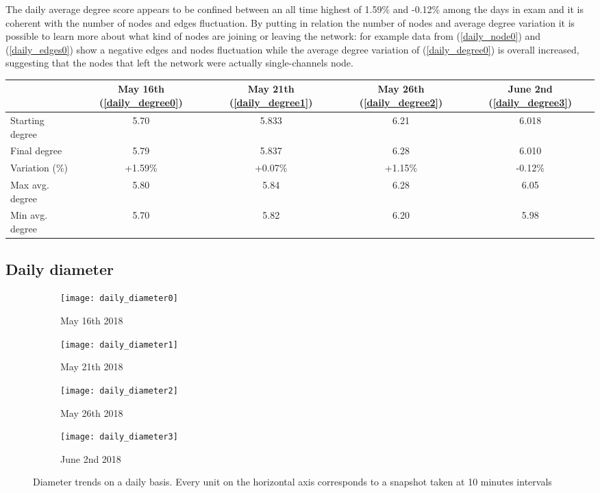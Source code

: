 	The daily average degree score appears to be confined between an all time highest of 1.59\% and -0.12\% among the days in exam and it is coherent with the number of nodes and edges fluctuation. By putting in relation the number of nodes and average degree variation it is possible to learn more about what kind of nodes are joining or leaving the network: for example data from (\ref{daily_node0}) and (\ref{daily_edges0}) show a negative edges and nodes fluctuation while the average degree variation of (\ref{daily_degree0}) is overall increased, suggesting that the nodes that left the network were actually single-channels node.


	\begin{center}
		\begin{tabulary}{\linewidth}{| L | C | C | C | C |}
			\hline	
			& May 16th (\ref{daily_degree0}) & May 21th (\ref{daily_degree1}) & May 26th (\ref{daily_degree2}) & June 2nd (\ref{daily_degree3}) \\
			\hline
			Starting degree & 5.70 & 5.833 & 6.21  & 6.018 \\ \hline
			Final degree & 5.79 & 5.837 & 6.28 & 6.010 \\ \hline
			Variation (\%) & +1.59\% & +0.07\% & +1.15\% & -0.12\% \\ \hline
			Max avg. degree & 5.80 & 5.84 & 6.28 & 6.05 \\ \hline
			Min avg. degree & 5.70 & 5.82 & 6.20 & 5.98 \\ \hline		
		\end{tabulary}
	\end{center}
	
	\subsection{Daily diameter}
	
		\begin{figure}[h]
		\centering
		\begin{subfigure}{0.49\textwidth}
			\centering
			\texttt{[image: daily\_diameter0]}
			\caption{May 16th 2018}
			\label{daily_diameter0}
		\end{subfigure}
		\begin{subfigure}{0.49\textwidth}
			\centering
			\texttt{[image: daily\_diameter1]}
			\caption{May 21th 2018}
			\label{daily_diameter1}
		\end{subfigure}
		\begin{subfigure}{0.49\textwidth}
			\centering
			\texttt{[image: daily\_diameter2]}
			\caption{May 26th 2018}
			\label{daily_diameter2}
		\end{subfigure}
		\begin{subfigure}{0.49\textwidth}
			\centering
			\texttt{[image: daily\_diameter3]}
			\caption{June 2nd 2018}
			\label{daily_diameter3}
		\end{subfigure}
		
		\caption{Diameter trends on a daily basis. Every unit on the horizontal axis corresponds to a snapshot taken at 10 minutes intervals}
		\label{daily_diameter}
	\end{figure}
	

